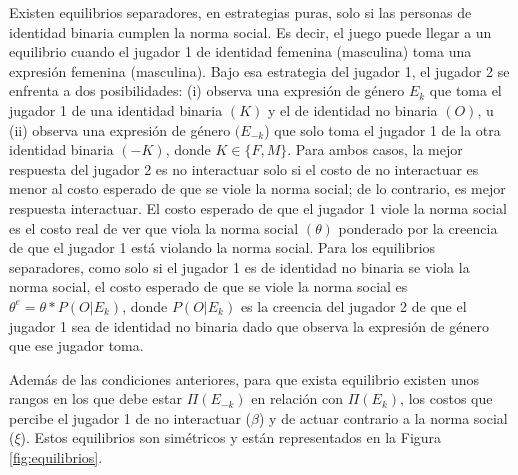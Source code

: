 Existen equilibrios separadores, en estrategias puras, solo si las personas de identidad binaria cumplen la norma social. Es decir, el juego puede llegar a un equilibrio cuando el jugador 1 de identidad femenina (masculina) toma una expresión femenina (masculina). Bajo esa estrategia del jugador 1, el jugador 2 se enfrenta a dos posibilidades: (i) observa una expresión de género $E_k$ que toma el jugador 1 de una identidad binaria $(K)$ y el de identidad no binaria $(O)$, u (ii) observa una expresión de género $(E_{-k}$) que solo toma el jugador 1 de la otra identidad binaria $(-K)$, donde $K \in \{F,M\}$. Para ambos casos, la mejor respuesta del jugador 2 es no interactuar solo si el costo de no interactuar es menor al costo esperado de que se viole la norma social; de lo contrario, es mejor respuesta interactuar. El costo esperado de que el jugador 1 viole la norma social es el costo real de ver que viola la norma social $(\theta)$ ponderado por la creencia de que el jugador 1 está violando la norma social. Para los equilibrios separadores, como solo si el jugador 1 es de identidad no binaria se viola la norma social, el costo esperado de que se viole la norma social es $\theta^e=\theta*P(O|E_k)$, donde $P(O|E_k)$ es la creencia del jugador 2 de que el jugador 1 sea de identidad no binaria dado que observa la expresión de género que ese jugador toma. 

Además de las condiciones anteriores, para que exista equilibrio existen unos rangos en los que debe estar $\Pi(E_{-k})$  en relación con $\Pi(E_k)$, los costos que percibe el jugador 1 de no interactuar ($\beta$) y de actuar contrario a la norma social ($\xi$). Estos equilibrios son simétricos y están representados en la Figura \ref{fig:equilibrios}.

